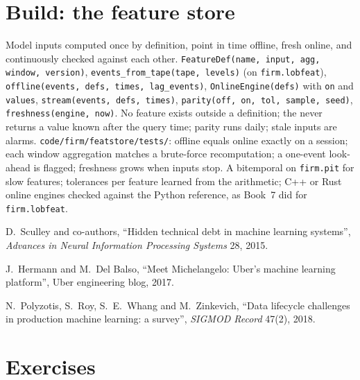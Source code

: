 \section{Build: the feature store}\label{bld:ml:data-and-feature-stores:featstore}

\begin{build}
 Model inputs computed once by definition, point in time offline, fresh online, and continuously checked
against each other.
 \texttt{FeatureDef(name, input, agg, window, version)}, \texttt{events\_from\_tape(tape, levels)} (on
\texttt{firm.lobfeat}), \texttt{offline(events, defs, times, lag\_events)}, \texttt{OnlineEngine(defs)} with \texttt{on} and
\texttt{values}, \texttt{stream(events, defs, times)}, \texttt{parity(off, on, tol, sample, seed)}, \texttt{freshness(engine,
now)}.
 No feature exists outside a definition; the  never returns a value known after the query time;
parity runs daily; stale inputs are alarms.
 \texttt{code/firm/featstore/tests/}: offline equals online exactly on a session; each window
aggregation matches a brute-force recomputation; a one-event look-ahead is flagged; freshness grows when inputs stop.
 A bitemporal  on \texttt{firm.pit} for slow features; tolerances per feature learned from the
arithmetic; C++ or Rust online engines checked against the Python reference, as Book~7 did for \texttt{firm.lobfeat}.
\end{build}

\begin{omsources}
\item D.~Sculley and co-authors, ``Hidden technical debt in machine learning systems'', \emph{Advances in Neural Information
Processing Systems} 28, 2015.
\item J.~Hermann and M.~Del Balso, ``Meet Michelangelo: Uber's machine learning platform'', Uber engineering blog, 2017.
\item N.~Polyzotis, S.~Roy, S.~E.~Whang and M.~Zinkevich, ``Data lifecycle challenges in production machine learning: a
survey'', \emph{SIGMOD Record} 47(2), 2018.
\end{omsources}

\section{Exercises}

